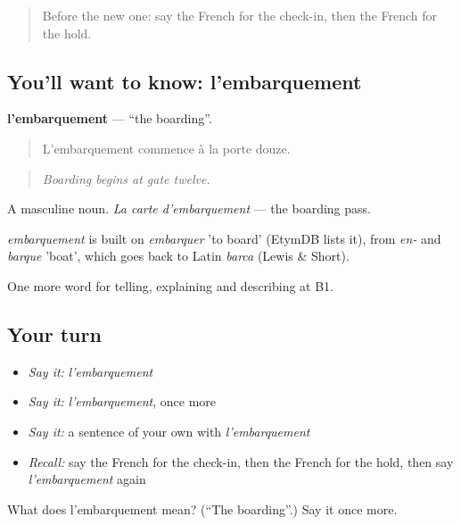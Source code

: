 \label{lesson:FR-C416-embarquement}



\begin{quote}
Before the new one: say the French for the check-in, then the French for the hold.
\end{quote}

\subsection*{You'll want to know: l'embarquement}
\textbf{l'embarquement} — \textquotedblleft{}the boarding\textquotedblright{}.

\begin{quote}
L'embarquement commence à la porte douze.
\end{quote}

\begin{quote}
\emph{Boarding begins at gate twelve.}
\end{quote}

A masculine noun. \emph{La carte d'embarquement} — the boarding pass.

\begin{cousinweb}
\emph{embarquement} is built on \emph{embarquer} 'to board' (EtymDB lists it), from \emph{en-} and \emph{barque} 'boat', which goes back to Latin \emph{barca} (Lewis \& Short).
\end{cousinweb}

\begin{grammarlens}[title={What you've built}]
One more word for telling, explaining and describing at B1.
\end{grammarlens}

\subsection*{Your turn}
\begin{itemize}
\raggedright
  \item \emph{Say it:} \emph{l'embarquement}
  \item \emph{Say it:} \emph{l'embarquement}, once more
  \item \emph{Say it:} a sentence of your own with \emph{l'embarquement}
  \item \emph{Recall:} say the French for the check-in, then the French for the hold, then say \emph{l'embarquement} again
\end{itemize}

\begin{tcolorbox}[breakable,colback=teal!4,colframe=teal!35!black,title={Before you move on}]
What does l'embarquement mean? (\textquotedblleft{}The boarding\textquotedblright{}.) Say it once more.
\end{tcolorbox}
